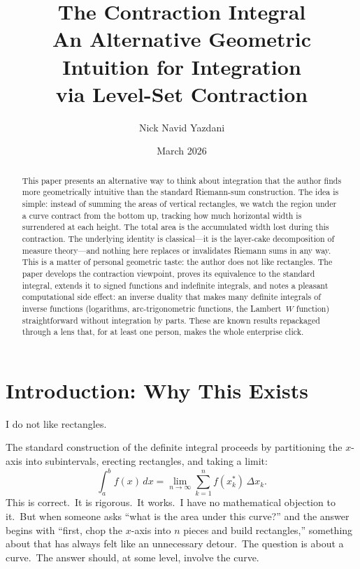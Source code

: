 \documentclass[11pt,a4paper]{article}
\title{\textbf{The Contraction Integral}\\[6pt]
\large An Alternative Geometric Intuition for Integration\\
via Level-Set Contraction}
\author{Nick Navid Yazdani}
\date{March 2026}
\begin{document}
\maketitle

\begin{abstract}
This paper presents an alternative way to think about integration that the author finds
more geometrically intuitive than the standard Riemann-sum construction. The idea is
simple: instead of summing the areas of vertical rectangles, we watch the region under a
curve contract from the bottom up, tracking how much horizontal width is surrendered at
each height. The total area is the accumulated width lost during this contraction. The
underlying identity is classical---it is the layer-cake decomposition of measure theory---and
nothing here replaces or invalidates Riemann sums in any way. This is a matter of personal
geometric taste: the author does not like rectangles. The paper develops the contraction
viewpoint, proves its equivalence to the standard integral, extends it to signed functions and
indefinite integrals, and notes a pleasant computational side effect: an inverse duality that
makes many definite integrals of inverse functions (logarithms, arc-trigonometric functions,
the Lambert~$W$ function) straightforward without integration by parts. These are known
results repackaged through a lens that, for at least one person, makes the whole enterprise
click.
\end{abstract}

\tableofcontents
\newpage

\section{Introduction: Why This Exists}

I do not like rectangles.

The standard construction of the definite integral proceeds by partitioning the $x$-axis into
subintervals, erecting rectangles, and taking a limit:
\[
\int_a^b f(x)\,dx = \lim_{n\to\infty} \sum_{k=1}^{n} f(x_k^*)\,\Delta x_k.
\]
This is correct.\ It is rigorous.\ It works.\ I have no mathematical objection to it.\ But when
someone asks ``what is the area under this curve?'' and the answer begins with ``first, chop
the $x$-axis into $n$ pieces and build rectangles,'' something about that has always felt like an
unnecessary detour.\ The question is about a curve.\ The answer should, at some level, involve
the curve.
\end{document}
